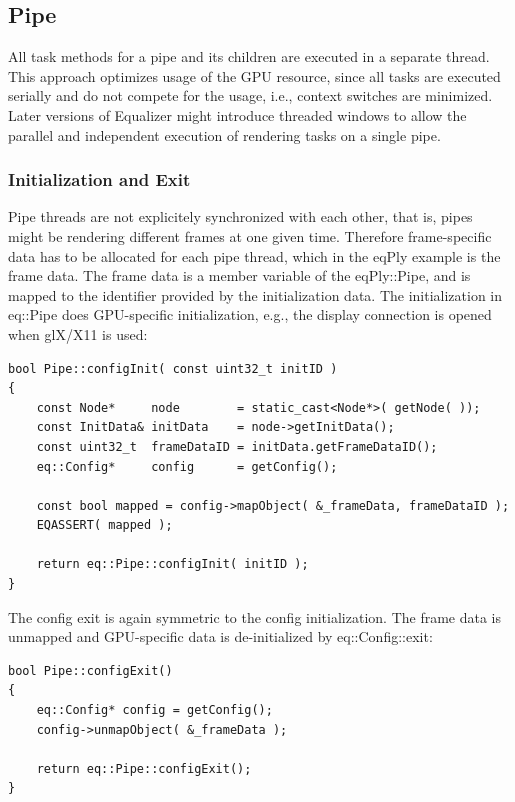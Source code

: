 \documentclass[10pt,a4]{scrartcl}
\begin{document}
\subsection{Pipe}

All task methods for a pipe and its children are executed in a separate
thread. This approach optimizes usage of the GPU resource, since all
tasks are executed serially and do not compete for the usage, i.e.,
context switches are minimized. Later versions of Equalizer might
introduce threaded windows to allow the parallel and independent
execution of rendering tasks on a single pipe.

\subsubsection{Initialization and Exit}

Pipe threads are not explicitely synchronized with each other, that is,
pipes might be rendering different frames at one given time. Therefore
frame-specific data has to be allocated for each pipe thread, which in
the \textsf{eqPly} example is the frame data. The frame data is a member
variable of the \textsf{eqPly::Pipe}, and is mapped to the identifier
provided by the initialization data. The initialization in
\textsf{eq::Pipe} does GPU-specific initialization, e.g., the display
connection is opened when glX/X11 is used:

{\footnotesize\begin{lstlisting}
bool Pipe::configInit( const uint32_t initID )
{
    const Node*     node        = static_cast<Node*>( getNode( ));
    const InitData& initData    = node->getInitData();
    const uint32_t  frameDataID = initData.getFrameDataID();
    eq::Config*     config      = getConfig();

    const bool mapped = config->mapObject( &_frameData, frameDataID );
    EQASSERT( mapped );

    return eq::Pipe::configInit( initID );
}
\end{lstlisting}}

The config exit is again symmetric to the config initialization. The
frame data is unmapped and GPU-specific data is de-initialized by
\textsf{eq::Config::exit}:

{\footnotesize\begin{lstlisting}
bool Pipe::configExit()
{
    eq::Config* config = getConfig();
    config->unmapObject( &_frameData );

    return eq::Pipe::configExit();
}
\end{lstlisting}}
\end{document}
